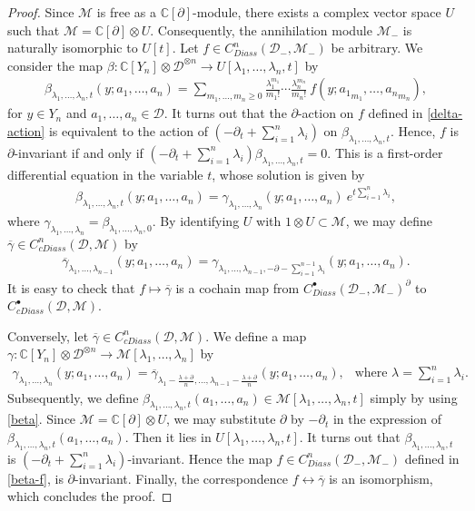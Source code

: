 \documentclass[a4paper,reqno,10pt]{amsart}
\theoremstyle{plain}
\theoremstyle{definition}
\theoremstyle{remark}
\newcommand{\C}{\mathbb{C}}
\newcommand{\D}{\mathcal{D}}
\newcommand{\M}{\mathcal{M}}
\newcommand{\p}{\partial}
\newcommand{\la}{\lambda}
\begin{document}
\begin{proof}
Since $\M$ is free as a $\mathbb{C}[\partial]$-module, there exists a
complex vector space $U$ such that $\mathcal{M} = \mathbb{C} [\p] \otimes U$. Consequently, the annihilation module $\M_-$ is naturally isomorphic to
$U[t]$. Let $f \in C^n_{Diass} (\D_{-},\M_{-})$ be arbitrary. We consider the map $\beta : \C[Y_n] \otimes \D^{\otimes n} \to U[\la_1, \ldots, \la_n,t]$ by 
\begin{align}\label{beta-f}
    \beta_{\la_1, \ldots, \la_n, t }(y; a_1, \ldots, a_n)= \sum _{m_1, \ldots, m_n \geq 0} \frac{\la_1^{m_1}}{m_1 !} \cdots \frac{\la_n^{m_n}}{m_n !} ~ \! f(y;{a_1}_{m_1}, \ldots, {a_n}_{m_n} ),
\end{align}
for $y \in Y_n$ and $a_1, \ldots, a_n \in \D$. It turns out that the $\p$-action on $f$ defined in \eqref{delta-action} is equivalent to the action of $(-\p_t + \sum \limits _{i=1}^{n} \la_i)$ on $\beta_{\la_1, \ldots, \la_n,t}$. Hence, $f$ is $\p$-invariant if and only if $(-\p_t + \sum \limits _{i=1}^{n} \la_i)\beta_{\la_1, \ldots, \la_n,t}=0$. This is a first-order differential equation in the variable $t$, whose solution is given by 
\begin{align}\label{beta}
    \beta_{\la_1, \ldots, \la_n,t}(y; a_1, \ldots, a_n) = \gamma_{\la_1, \ldots, \la_n}(y; a_1, \ldots, a_n) ~ \! e^{t \sum \limits _{i=1}^{n}\la_i},
\end{align}
where $\gamma_{\la_1, \ldots, \la_n} = \beta_{\la_1, \ldots, \la_n,0}$. By identifying $U$ with $1 \otimes U \subset \M$, we may define $\overline{\gamma} \in C^n_{cDiass}(\mathcal{D},\M)$ by 
\begin{align*}
    \overline{\gamma}_{\la_1, \ldots, \la_{n-1}}(y; a_1, \ldots, a_n) = \gamma_{\la_1, \ldots, \la_{n-1}, -\p - \sum \limits _{i=1}^{n-1}\la_i}(y; a_1, \ldots, a_n).
\end{align*}
It is easy to check that $f \mapsto \overline{\gamma} $ is a cochain map from $C^\bullet_{Diass}
(\D_{-},\M_{-})^{\partial}$ to $C^\bullet_{cDiass}(\mathcal{D},\M)$.

Conversely, let $ \overline{\gamma} \in C^n_{cDiass}(\mathcal{D},\M)$. We define a map $\gamma : \C[Y_n] \otimes \D^{\otimes n} \to \M[\la_1, \ldots, \la_n]$ by 
\begin{align*}
    \gamma_{\la_1, \ldots, \la_n}(y; a_1, \ldots, a_n) = \overline{\gamma}_{\la_1 - \frac{\la+\p}{n}, \ldots, \la_{n-1} - \frac{\la+\p}{n}}(y; a_1, \ldots, a_n), ~~\text{ where } \la = \sum_{i=1}^{n} \la_i.
\end{align*}
Subsequently, we define $ \beta_{\la_1, \ldots, \la_n,t} (a_1, \ldots, a_n) \in \M [\la_1, \ldots, \la_n, t]$ simply by using \eqref{beta}. Since $\M = \C [\partial] \otimes U$, we may substitute $\partial$ by $-\p_t$ in the expression of  $ \beta_{\la_1, \ldots, \la_n,t} (a_1, \ldots, a_n)$. Then it lies in $U [\la_1, \ldots, \la_n, t]$. It turns out that $ \beta_{\la_1, \ldots, \la_n,t}$ is $(-\p_t + \sum \limits _{i=1}^{n} \la_i)$-invariant. Hence the map $f \in C^n_{Diass}
(\D_{-},\M_{-})$ defined in \eqref{beta-f}, is $\p$-invariant. Finally, the correspondence $f \leftrightarrow \overline{\gamma}$ is an isomorphism, which concludes the proof.
\end{proof}
\end{document}

